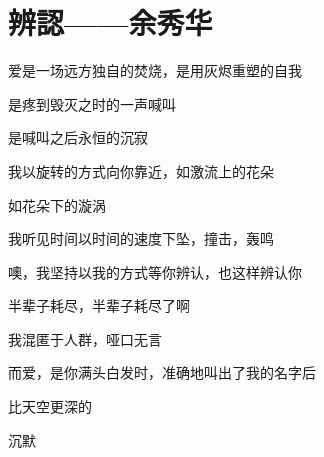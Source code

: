 \section{辨認——余秀华}
爱是一场远方独自的焚烧，是用灰烬重塑的自我

是疼到毁灭之时的一声喊叫
 
是喊叫之后永恒的沉寂
 
我以旋转的方式向你靠近，如激流上的花朵
 
如花朵下的漩涡
 
我听见时间以时间的速度下坠，撞击，轰鸣
 
噢，我坚持以我的方式等你辨认，也这样辨认你
 
半辈子耗尽，半辈子耗尽了啊
 
我混匿于人群，哑口无言
 
而爱，是你满头白发时，准确地叫出了我的名字后
 
比天空更深的
 
沉默